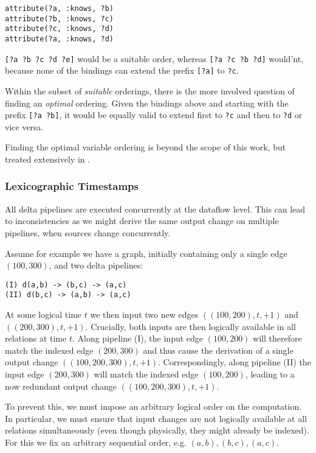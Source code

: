 \documentclass[../index.tex]{subfiles}
\begin{document}
\begin{verbatim}
attribute(?a, :knows, ?b)
attribute(?b, :knows, ?c)
attribute(?c, :knows, ?d)
attribute(?a, :knows, ?d)
\end{verbatim}

\texttt{[?a ?b ?c ?d ?e]} would be a suitable order, whereas
\texttt{[?a ?c ?b ?d]} would'nt, because none of the bindings can
extend the prefix \texttt{[?a]} to \texttt{?c}.

Within the subset of \emph{suitable} orderings, there is the more
involved question of finding an \emph{optimal} ordering. Given the
bindings above and starting with the prefix \texttt{[?a ?b]}, it would
be equally valid to extend first to \texttt{?c} and then to
\texttt{?d} or vice versa.

Finding the optimal variable ordering is beyond the scope of this
work, but treated extensively in \cite{abo2016faq}.

\subsubsection{Lexicographic Timestamps}

All delta pipelines are executed concurrently at the dataflow
level. This can lead to inconsistencies as we might derive the same
output change on multiple pipelines, when sources change
concurrently.

Assume for example we have a graph, initially containing only a single
edge $(100,300)$, and two delta pipelines:

\begin{verbatim}
(I) d(a,b) -> (b,c) -> (a,c)
(II) d(b,c) -> (a,b) -> (a,c)
\end{verbatim}

At some logical time $t$ we then input two new edges
$((100,200),t,+1)$ and $((200,300),t,+1)$. Crucially, both inputs are
then logically available in all relations at time $t$. Along pipeline
(I), the input edge $(100,200)$ will therefore match the indexed edge
$(200,300)$ and thus cause the derivation of a single output change
$((100,200,300),t,+1)$. Correspondingly, along pipeline (II) the input
edge $(200,300)$ will match the indexed edge $(100,200)$, leading to a
now redundant output change $((100,200,300),t,+1)$.

To prevent this, we must impose an arbitrary logical order on the
computation. In particular, we must ensure that input changes are not
logically available at all relations simultaneously (even though
physically, they might already be indexed). For this we fix an
arbitrary sequential order, e.g. $(a,b),(b,c),(a,c)$.
\end{document}
